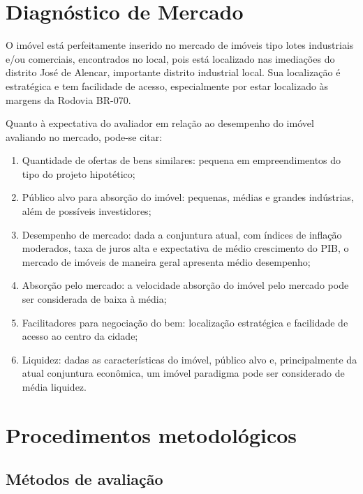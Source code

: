 \documentclass[
  10pt,
  a4paper]{article}
\providecommand{\tightlist}{%
  \setlength{\itemsep}{0pt}\setlength{\parskip}{0pt}}
\begin{document}
\section{Diagnóstico de Mercado}\label{diagnuxf3stico-de-mercado}

O imóvel está perfeitamente inserido no mercado de imóveis tipo lotes
industriais e/ou comerciais, encontrados no local, pois está localizado
nas imediações do distrito José de Alencar, importante distrito
industrial local. Sua localização é estratégica e tem facilidade de
acesso, especialmente por estar localizado às margens da Rodovia BR-070.

Quanto à expectativa do avaliador em relação ao desempenho do imóvel
avaliando no mercado, pode-se citar:

\begin{enumerate}
\def\labelenumi{\alph{enumi}.}
\tightlist
\item
  Quantidade de ofertas de bens similares: pequena em empreendimentos do
  tipo do projeto hipotético;
\item
  Público alvo para absorção do imóvel: pequenas, médias e grandes
  indústrias, além de possíveis investidores;
\item
  Desempenho de mercado: dada a conjuntura atual, com índices de
  inflação moderados, taxa de juros alta e expectativa de médio
  crescimento do PIB, o mercado de imóveis de maneira geral apresenta
  médio desempenho;
\item
  Absorção pelo mercado: a velocidade absorção do imóvel pelo mercado
  pode ser considerada de baixa à média;
\item
  Facilitadores para negociação do bem: localização estratégica e
  facilidade de acesso ao centro da cidade;
\item
  Liquidez: dadas as características do imóvel, público alvo e,
  principalmente da atual conjuntura econômica, um imóvel paradigma pode
  ser considerado de média liquidez.
\end{enumerate}

\section{Procedimentos
metodológicos}\label{procedimentos-metodoluxf3gicos}

\subsection{Métodos de avaliação}\label{muxe9todos-de-avaliauxe7uxe3o}
\end{document}
